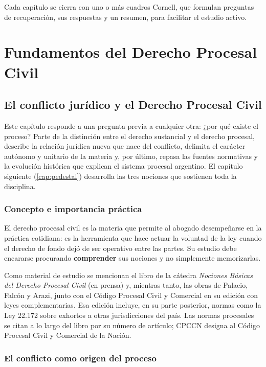 \documentclass[12pt,oneside]{book}
\begin{document}
Cada capítulo se cierra con uno o más cuadros Cornell, que formulan preguntas de recuperación, sus respuestas y un resumen, para facilitar el estudio activo.

\part{Fundamentos del Derecho Procesal Civil}\label{pt:fund}

\chapter{El conflicto jurídico y el Derecho Procesal Civil}
\label{cap:conflicto}

Este capítulo responde a una pregunta previa a cualquier otra: ¿por qué existe el proceso? Parte de la distinción entre el derecho sustancial y el derecho procesal, describe la relación jurídica nueva que nace del conflicto, delimita el carácter autónomo y unitario de la materia y, por último, repasa las fuentes normativas y la evolución histórica que explican el sistema procesal argentino. El capítulo siguiente (\ref{cap:pedestal}) desarrolla las tres nociones que sostienen toda la disciplina.

\section{Concepto e importancia práctica}

El derecho procesal civil es la materia que permite al abogado desempeñarse en la práctica cotidiana: es la herramienta que hace actuar la voluntad de la ley cuando el derecho de fondo dejó de ser operativo entre las partes. Su estudio debe encararse procurando \textbf{comprender} sus nociones y no simplemente memorizarlas.

\begin{note}
Como material de estudio se mencionan el libro de la cátedra \textit{Nociones Básicas del Derecho Procesal Civil} (en prensa) y, mientras tanto, las obras de Palacio, Falcón y Arazi, junto con el Código Procesal Civil y Comercial en su edición con leyes complementarias. Esa edición incluye, en su parte posterior, normas como la Ley 22.172 sobre exhortos a otras jurisdicciones del país. Las normas procesales se citan a lo largo del libro por su número de artículo; CPCCN designa al Código Procesal Civil y Comercial de la Nación.
\end{note}

\section{El conflicto como origen del proceso}
\end{document}
